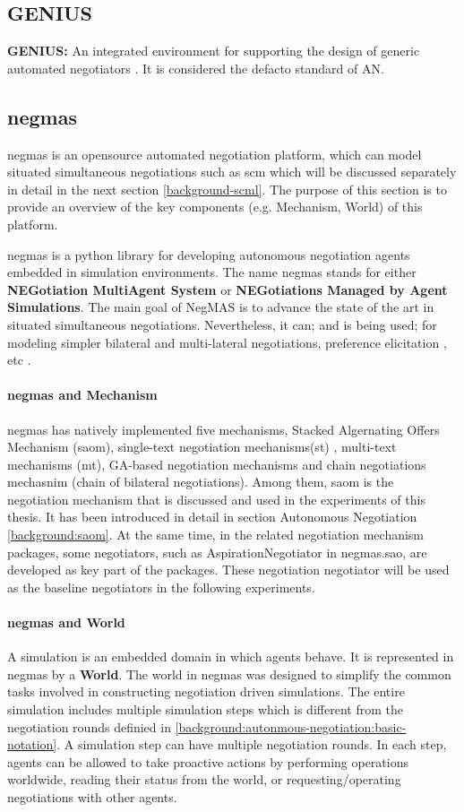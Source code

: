 \subsection{GENIUS}
\textbf{GENIUS:} An integrated environment for supporting the design of generic automated negotiators \parencite{Lin2014}. It is considered the defacto standard of AN.

\subsection{\gls{negmas}} \label{background:negmas}
\gls{negmas} is an opensource automated negotiation platform, which can model situated simultaneous negotiations such as \gls{scm} which will be discussed separately in detail in the next section \ref{background-scml}. The purpose of this section is to provide an overview of the key components (e.g. Mechanism, World) of this platform.

\gls{negmas} is a python library for developing autonomous negotiation agents embedded in simulation environments. The name negmas stands for either \textbf{NEGotiation MultiAgent System} or \textbf{NEGotiations Managed by Agent Simulations}. The main goal of NegMAS is to advance the state of the art in situated simultaneous negotiations. Nevertheless, it can; and is being used; for modeling simpler bilateral and multi-lateral negotiations, preference elicitation , etc \parencite{Mohammad2019}.

\paragraph{\gls{negmas} and Mechanism}
\gls{negmas} has natively implemented five mechanisms, Stacked Algernating Offers Mechanism (\gls{saom}), single-text negotiation mechanisms(st) \parencite{raiffa1982art}, multi-text mechanisms (mt), GA-based negotiation mechanisms\parencite{2015effects} and chain negotiations mechasnim (chain of bilateral negotiations). Among them, \gls{saom} is the negotiation mechanism that is discussed and used in the experiments of this thesis. It has been introduced in detail in section Autonomous Negotiation \ref{background:saom}. At the same time, in the related negotiation mechanism packages, some negotiators, such as AspirationNegotiator in negmas.sao, are developed as key part of the packages. These negotiation negotiator will be used as the baseline negotiators in the following experiments.
\paragraph{\gls{negmas} and World}
A simulation is an embedded domain in which agents behave. It is represented in \gls{negmas} by a \textbf{World}. The world in \gls{negmas} was designed to simplify the common tasks involved in constructing negotiation driven simulations\parencite{Mohammad2019}. The entire simulation includes multiple simulation steps which is different from the negotiation rounds definied in \ref{background:autonmous-negotiation:basic-notation}. A simulation step can have multiple negotiation rounds. In each step, agents can be allowed to take proactive actions by performing operations worldwide, reading their status from the world, or requesting/operating negotiations with other agents.
